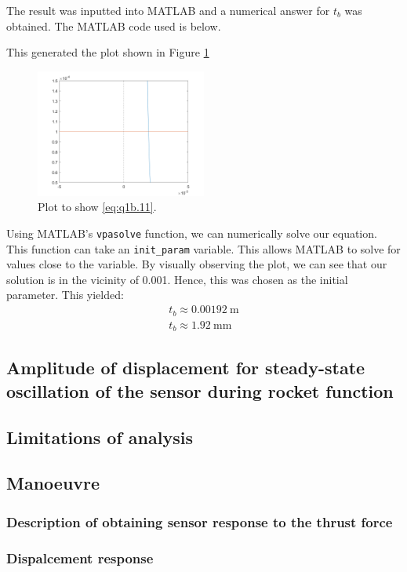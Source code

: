 \documentclass[11pt]{article}
\numberwithin{equation}{section}
\begin{document}
The result was inputted into MATLAB and a numerical answer for $t_b$ was obtained. The MATLAB code used is below.

This generated the plot shown in Figure \ref{q1b2}
\begin{figure}[H]
    \centering
    \includegraphics[width = 0.5\textwidth]{./img/q1b2.png}
    \caption{Plot to show \ref{eq:q1b.11}.}
    \label{q1b2}
\end{figure}
Using MATLAB's \lstinline{vpasolve} function, we can numerically solve our equation. This function can take an \lstinline{init_param} variable. This allows MATLAB to solve for values close to the variable. By visually observing the plot, we can see that our solution is in the vicinity of 0.001. Hence, this was chosen as the initial parameter. This yielded:
\begin{gather}
    t_b \approx \SI{0.00192}{\meter}\\
    t_b \approx \SI{1.92}{\milli\meter}
\end{gather}
\subsection{Amplitude of displacement for steady-state oscillation of the sensor during rocket function}
\subsection{Limitations of analysis}
\subsection{Manoeuvre}
\subsubsection{Description of obtaining sensor response to the thrust force}
\subsubsection{Dispalcement response}
\end{document}
